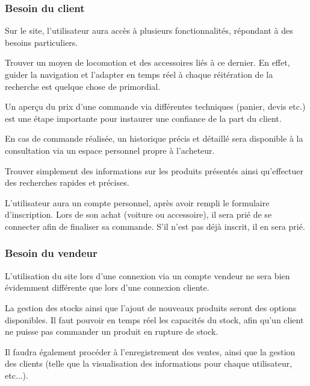 \documentclass[a4paper]{article}
\begin{document}
		\subsubsection{Besoin du client}
	Sur le site, l'utilisateur aura accès à plusieurs fonctionnalités, répondant à des besoins particuliers.
	
	Trouver un moyen de locomotion et des accessoires liés à ce dernier.
	En effet, guider la navigation et l'adapter en temps réel à chaque réitération de la recherche est quelque chose de primordial. 
	
	Un aperçu du prix d'une commande via différentes techniques (panier, devis etc.) est une étape importante pour instaurer une confiance de la part du client.
	
	En cas de commande réalisée, un historique précis et détaillé sera disponible à la consultation via un espace personnel propre à l'acheteur.
	
	Trouver simplement des informations sur les produits présentés ainsi qu'effectuer des recherches rapides et précises. 
	
	L'utilisateur aura un compte personnel, après avoir rempli le formulaire d'inscription. Lors de son achat (voiture ou accessoire), il sera prié de se connecter afin de finaliser sa commande. S'il n'est pas déjà inscrit, il en sera prié.
	
		\subsubsection{Besoin du vendeur}
		L'utilisation du site lors d'une connexion via un compte vendeur ne sera bien évidemment différente que lors d'une connexion cliente.
		
		La gestion des stocks ainsi que l'ajout de nouveaux produits seront des options disponibles. Il faut pouvoir en temps réel les capacités du stock, afin qu'un client ne puisse pas commander un produit en rupture de stock.
		
		Il faudra également procéder à l'enregistrement des ventes, ainsi que la gestion des clients (telle que la visualisation des informations pour chaque utilisateur, etc...). 
\end{document}
